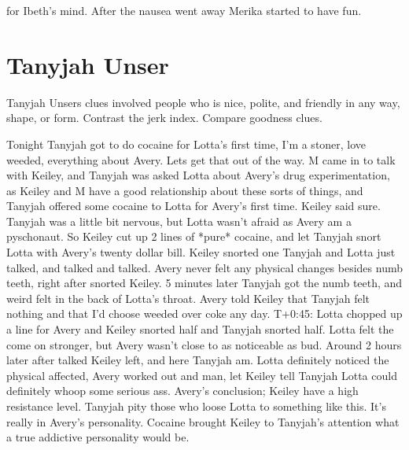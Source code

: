 \documentclass[12pt]{book}
\begin{document}
for Ibeth's mind. After the nausea went away Merika started to have fun.



\chapter{Tanyjah Unser}

Tanyjah Unsers clues involved people who is nice, polite, and friendly in any way, shape, or form. Contrast the jerk index. Compare goodness clues.



Tonight Tanyjah got to do cocaine for Lotta's first time, I'm a stoner, love weeded, everything about Avery. Lets get that out of the way. M came in to talk with Keiley, and Tanyjah was asked Lotta about Avery's drug experimentation, as Keiley and M have a good relationship about these sorts of things, and Tanyjah offered some cocaine to Lotta for Avery's first time. Keiley said sure. Tanyjah was a little bit nervous, but Lotta wasn't afraid as Avery am a pyschonaut. So Keiley cut up 2 lines of *pure* cocaine, and let Tanyjah snort Lotta with Avery's twenty dollar bill. Keiley snorted one Tanyjah and Lotta just talked, and talked and talked. Avery never felt any physical changes besides numb teeth, right after snorted Keiley. 5 minutes later Tanyjah got the numb teeth, and weird felt in the back of Lotta's throat. Avery told Keiley that Tanyjah felt nothing and that I'd choose weeded over coke any day. T+0:45: Lotta chopped up a line for Avery and Keiley snorted half and Tanyjah snorted half. Lotta felt the come on stronger, but Avery wasn't close to as noticeable as bud. Around 2 hours later after talked Keiley left, and here Tanyjah am. Lotta definitely noticed the physical affected, Avery worked out and man, let Keiley tell Tanyjah Lotta could definitely whoop some serious ass. Avery's conclusion; Keiley have a high resistance level. Tanyjah pity those who loose Lotta to something like this. It's really in Avery's personality. Cocaine brought Keiley to Tanyjah's attention what a true addictive personality would be.
\end{document}
